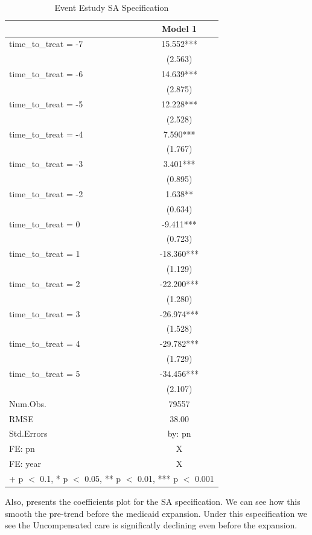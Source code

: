 \documentclass[
  12pt,
]{article}
\begin{document}
\begin{table}

\caption{\label{tab:Tab-5}Event Estudy SA Specification}
\centering
\begin{tabular}[t]{lc}
\toprule
  & Model 1\\
\midrule
time\_to\_treat = -7 & 15.552***\\
 & (2.563)\\
time\_to\_treat = -6 & 14.639***\\
 & (2.875)\\
time\_to\_treat = -5 & 12.228***\\
 & (2.528)\\
time\_to\_treat = -4 & 7.590***\\
 & (1.767)\\
time\_to\_treat = -3 & 3.401***\\
 & (0.895)\\
time\_to\_treat = -2 & 1.638**\\
 & (0.634)\\
time\_to\_treat = 0 & -9.411***\\
 & (0.723)\\
time\_to\_treat = 1 & -18.360***\\
 & (1.129)\\
time\_to\_treat = 2 & -22.200***\\
 & (1.280)\\
time\_to\_treat = 3 & -26.974***\\
 & (1.528)\\
time\_to\_treat = 4 & -29.782***\\
 & (1.729)\\
time\_to\_treat = 5 & -34.456***\\
 & (2.107)\\
\midrule
Num.Obs. & 79557\\
RMSE & 38.00\\
Std.Errors & by: pn\\
FE: pn & X\\
FE: year & X\\
\bottomrule
\multicolumn{2}{l}{\rule{0pt}{1em}+ p $<$ 0.1, * p $<$ 0.05, ** p $<$ 0.01, *** p $<$ 0.001}\\
\end{tabular}
\end{table}

Also,  presents the coefficients plot for the SA
specification. We can see how this smooth the pre-trend before the
medicaid expansion. Under this especification we see the Uncompensated
care is significatly declining even before the expansion.
\end{document}
